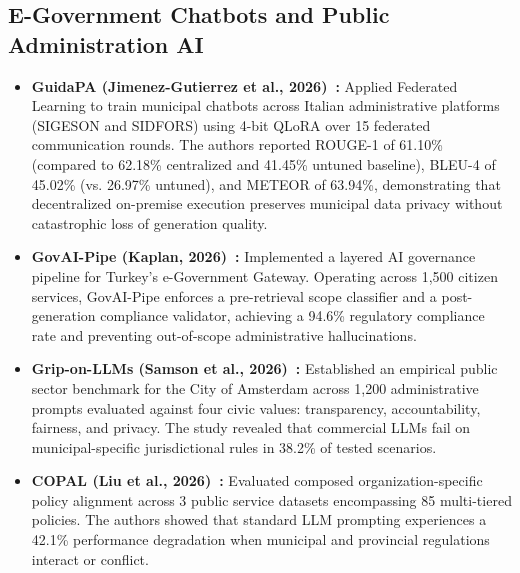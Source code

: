 \documentclass[11pt,a4paper]{article}
\begin{document}
\subsection{E-Government Chatbots and Public Administration AI}
\begin{itemize}
    \item \textbf{GuidaPA (Jimenez-Gutierrez et al., 2026)~\cite{guidapa2026}:} Applied Federated Learning to train municipal chatbots across Italian administrative platforms (SIGESON and SIDFORS) using 4-bit QLoRA over 15 federated communication rounds. The authors reported ROUGE-1 of 61.10\% (compared to 62.18\% centralized and 41.45\% untuned baseline), BLEU-4 of 45.02\% (vs. 26.97\% untuned), and METEOR of 63.94\%, demonstrating that decentralized on-premise execution preserves municipal data privacy without catastrophic loss of generation quality.
    \item \textbf{GovAI-Pipe (Kaplan, 2026)~\cite{govaipipe2026}:} Implemented a layered AI governance pipeline for Turkey's e-Government Gateway. Operating across 1,500 citizen services, GovAI-Pipe enforces a pre-retrieval scope classifier and a post-generation compliance validator, achieving a 94.6\% regulatory compliance rate and preventing out-of-scope administrative hallucinations.
    \item \textbf{Grip-on-LLMs (Samson et al., 2026)~\cite{griponllms2026}:} Established an empirical public sector benchmark for the City of Amsterdam across 1,200 administrative prompts evaluated against four civic values: transparency, accountability, fairness, and privacy. The study revealed that commercial LLMs fail on municipal-specific jurisdictional rules in 38.2\% of tested scenarios.
    \item \textbf{COPAL (Liu et al., 2026)~\cite{copal2026}:} Evaluated composed organization-specific policy alignment across 3 public service datasets encompassing 85 multi-tiered policies. The authors showed that standard LLM prompting experiences a 42.1\% performance degradation when municipal and provincial regulations interact or conflict.
\end{itemize}
\end{document}
